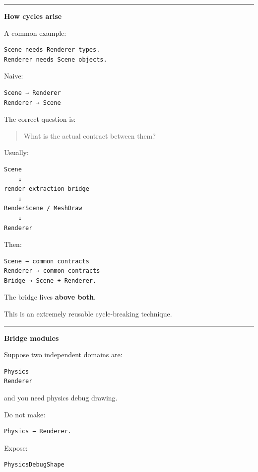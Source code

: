 \begin{center}\rule{0.5\linewidth}{0.5pt}\end{center}

\textbf{How cycles arise}

A common example:

\begin{verbatim}
Scene needs Renderer types.
Renderer needs Scene objects.
\end{verbatim}

Naive:

\begin{verbatim}
Scene → Renderer
Renderer → Scene
\end{verbatim}

The correct question is:

\begin{quote}
What is the actual contract between them?
\end{quote}

Usually:

\begin{verbatim}
Scene
    ↓
render extraction bridge
    ↓
RenderScene / MeshDraw
    ↓
Renderer
\end{verbatim}

Then:

\begin{verbatim}
Scene → common contracts
Renderer → common contracts
Bridge → Scene + Renderer.
\end{verbatim}

The bridge lives \textbf{above both}.

This is an extremely reusable cycle-breaking technique.

\begin{center}\rule{0.5\linewidth}{0.5pt}\end{center}

\textbf{Bridge modules}

Suppose two independent domains are:

\begin{verbatim}
Physics
Renderer
\end{verbatim}

and you need physics debug drawing.

Do not make:

\begin{verbatim}
Physics → Renderer.
\end{verbatim}

Expose:

\begin{verbatim}
PhysicsDebugShape
\end{verbatim}

